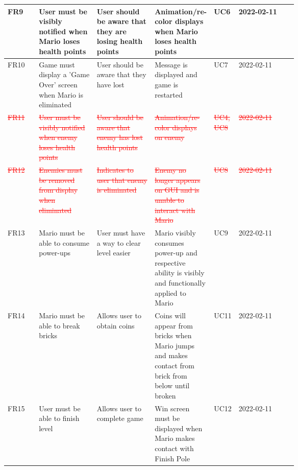 \documentclass[12pt, titlepage]{article}
\begin{document}
\begin{longtable}{|l|p{0.2\linewidth}|p{0.2\linewidth}|p{0.2\linewidth}|p{0.06\linewidth}|l|}
FR9         & User must be visibly notified when Mario loses health points         & User should be aware that they are losing health points                              & Animation/re-color displays when Mario loses health points                                          & UC6               & 2022-02-11       \\ \hline
FR10        & Game must display a 'Game Over' screen when Mario is eliminated      & User should be aware that they have lost                                             & Message is displayed and game is restarted                                                          & UC7               & 2022-02-11       \\ \hline
\textcolor{red}{\st{FR11}}        & \textcolor{red}{\st{User must be visibly notified when enemy loses health points}}         & \textcolor{red}{\st{User should be aware that enemy has lost health points}}                               & \textcolor{red}{\st{Animation/re-color displays on enemy}}                                                                & \textcolor{red}{\st{UC4, UC8}}          & \textcolor{red}{\st{2022-02-11}}       \\ \hline
\textcolor{red}{\st{FR12}}        & \textcolor{red}{\st{Enemies must be removed from display when eliminated}}                 & \textcolor{red}{\st{Indicates to user that enemy is eliminated}}                                           & \textcolor{red}{\st{Enemy no longer appears on GUI and is unable to interact with Mario}}                                 & \textcolor{red}{\st{UC8}}               & \textcolor{red}{\st{2022-02-11}}       \\ \hline
FR13        & Mario must be able to consume power-ups                              & User must have a way to clear level easier                                           & Mario visibly consumes power-up and respective ability is visibly and functionally applied to Mario & UC9               & 2022-02-11       \\ \hline
FR14        & Mario must be able to break bricks                                   & Allows user to obtain coins                                                          & Coins will appear from bricks when Mario jumps and makes contact from brick from below until broken & UC11              & 2022-02-11       \\ \hline
FR15        & User must be able to finish level                                    & Allows user to complete game                                                         & Win screen must be displayed when Mario makes contact with Finish Pole                              & UC12              & 2022-02-11       \\ \hline
\end{longtable}
\end{document}

